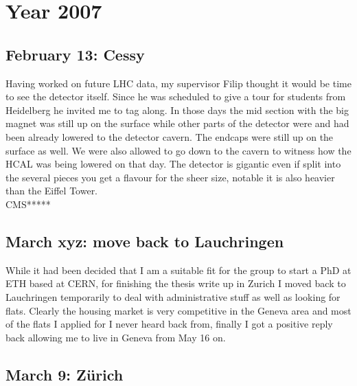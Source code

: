 \chapter{Year 2007}
\label{2007}

\section{February 13: Cessy}
\label{2007:Cessy}

Having worked on future LHC data, my supervisor Filip thought it would be time to see the detector itself. Since he was scheduled to give a tour for students from Heidelberg he invited me to tag along. In those days the mid section with the big magnet was still up on the surface while other parts of the detector were and had been already lowered to the detector cavern. The endcaps were still up on the surface as well. We were also allowed to go down to the cavern to witness how the HCAL was being lowered on that day. The detector is gigantic even if split into the several pieces you get a flavour for the sheer size, notable it is also heavier than the Eiffel Tower.\\

CMS*****

\section{March xyz: move back to Lauchringen}
\label{moveLauchringen2006}

While it had been decided that I am a suitable fit for the group to start a PhD at ETH based at CERN, for finishing the thesis write up in Zurich I moved back to Lauchringen temporarily to deal with administrative stuff as well as looking for flats. Clearly the housing market is very competitive in the Geneva area and most of the flats I applied for I never heard back from, finally I got a positive reply back allowing me to live in Geneva from May 16 on. 


\section{March 9: Z\"urich}
\label{2007:Zuerich}

